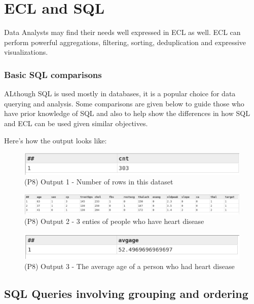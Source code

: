 \documentclass[a4paper,oneside,12pt]{book}
\begin{document}
\section{ECL and SQL}

Data Analysts may find their needs well expressed in ECL as well. ECL can perform powerful aggregations, filtering, sorting, deduplication and expressive visualizations.

\subsubsection{Basic SQL comparisons}

ALthough SQL is used mostly in databases, it is a popular choice for data querying and analysis. 
Some comparisons are given below to guide those who have prior knowledge of SQL and also to help show the differences in how SQL and ECL can be used given similar objectives.




Here's how the output looks like:

\begin{figure}[h]
    \centering
    \includegraphics[width=.55\linewidth]{../output/62/1.png}
    \caption{(P8) Output 1 - Number of rows in this dataset}
\end{figure}

\begin{figure}[h]
    \centering
    \includegraphics[width=\linewidth]{../output/62/2}
    \caption{(P8) Output 2 - 3 enties of people who have heart disease}
\end{figure}
\begin{figure}[h]
    \centering
    \includegraphics[width=.55\linewidth]{../output/62/3}
    \caption{(P8) Output 3 - The average age of a person who had heart disease}
\end{figure}

\subsection{SQL Queries involving grouping and ordering}
\end{document}
